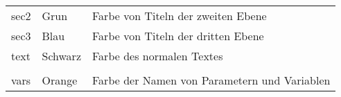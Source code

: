 \documentclass[a4paper,10pt]{article}
\begin{document}
\begin{justify}
\begin{tabular}{lll}
            \color{sec2}sec2  & \color{sec2}Grun        & \color{sec2}Farbe von Titeln der zweiten Ebene\\
            \color{sec3}sec3  & \color{sec3}Blau        & \color{sec3}Farbe von Titeln der dritten Ebene\\
            \color{text}text  & \color{text}Schwarz     & \color{text}Farbe des normalen Textes\\\\

            \color{vars}vars  & \color{vars}Orange      & \color{vars}Farbe der Namen von Parametern und Variablen\\
        \end{tabular}
    \end{justify}
\end{document}
